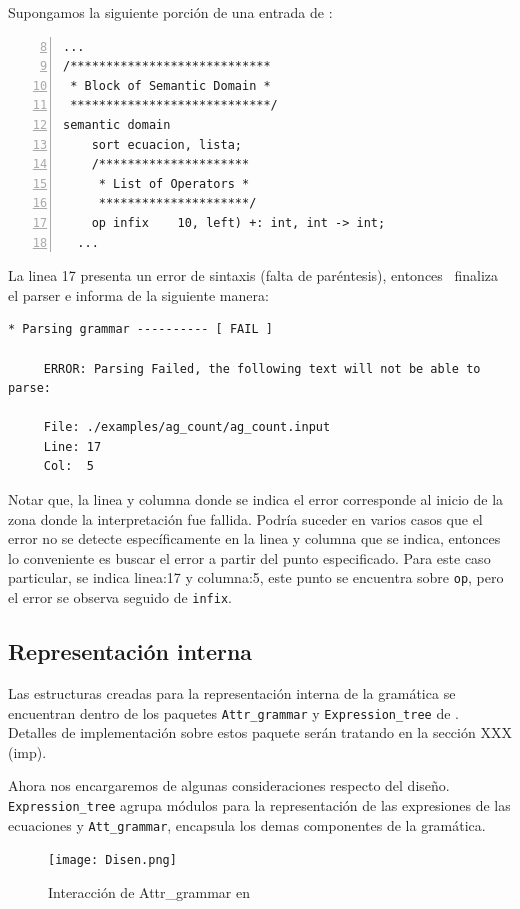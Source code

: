 Supongamos la siguiente porción de una entrada de \maggen:

\begin{lstlisting}[numbers=left, numberstyle=\tiny, numbersep=5pt, firstnumber=8, language=cobol, linewidth=12cm]
  ...
/****************************
 * Block of Semantic Domain *
 ****************************/
semantic domain
    sort ecuacion, lista;
    /*********************
     * List of Operators *
     *********************/
    op infix    10, left) +: int, int -> int;
  ...
\end{lstlisting}
La linea 17 presenta un error de sintaxis (falta de paréntesis), entonces \maggen\ finaliza el parser e informa de la siguiente manera:
\begin{lstlisting}[backgroundcolor=\color{white}, linewidth=15cm]
     * Parsing grammar ---------- [ FAIL ]

     ERROR: Parsing Failed, the following text will not be able to parse:

     File: ./examples/ag_count/ag_count.input
     Line: 17
     Col:  5
\end{lstlisting}
Notar que, la linea y columna donde se indica el error corresponde al inicio de la zona donde la interpretación fue fallida. Podría suceder en varios casos que el error no se detecte específicamente en la linea y columna que se indica, entonces lo conveniente es buscar el error a partir del punto especificado. Para este caso particular, se indica linea:17 y columna:5, este punto se encuentra sobre \texttt{op}, pero el error se observa seguido de \texttt{infix}.

\subsection*{Representación interna}
Las estructuras creadas para la representación interna de la gramática se encuentran dentro de los paquetes \texttt{Attr\_grammar} y \texttt{Expression\_tree} de \maggen. Detalles de implementación sobre estos paquete serán tratando en la sección XXX (imp). 

Ahora nos encargaremos de algunas consideraciones respecto del diseño. 
\texttt{Expression\_tree} agrupa módulos para la representación de las expresiones de las ecuaciones y \texttt{Att\_grammar}, encapsula los demas componentes de la gramática.
\begin{figure}\centering
\texttt{[image: Disen.png]}
\caption{\label{fig:disen}Interacción de Attr\_grammar en \maggen}
\end{figure}

